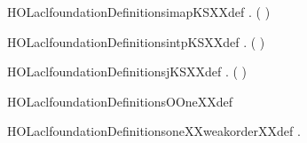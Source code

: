 \newcommand{\HOLaclfoundationDatatypesPrinc}{\UseVerbatim{HOLaclfoundationDatatypesPrinc}}
\newcommand{\HOLaclfoundationDatatypes}{
\HOLaclfoundationDatatypesForm\HOLaclfoundationDatatypesKripke\HOLaclfoundationDatatypesPrinc}
\begin{SaveVerbatim}{HOLaclfoundationDefinitionsimapKSXXdef}
\HOLTokenTurnstile{} \HOLSymConst{\HOLTokenForall{}}   .
      (    ) \HOLSymConst{=} 
\end{SaveVerbatim}
\newcommand{\HOLaclfoundationDefinitionsimapKSXXdef}{\UseVerbatim{HOLaclfoundationDefinitionsimapKSXXdef}}
\begin{SaveVerbatim}{HOLaclfoundationDefinitionsintpKSXXdef}
\HOLTokenTurnstile{} \HOLSymConst{\HOLTokenForall{}}   .
      (    ) \HOLSymConst{=} 
\end{SaveVerbatim}
\newcommand{\HOLaclfoundationDefinitionsintpKSXXdef}{\UseVerbatim{HOLaclfoundationDefinitionsintpKSXXdef}}
\begin{SaveVerbatim}{HOLaclfoundationDefinitionsjKSXXdef}
\HOLTokenTurnstile{} \HOLSymConst{\HOLTokenForall{}}   .  (    ) \HOLSymConst{=} 
\end{SaveVerbatim}
\newcommand{\HOLaclfoundationDefinitionsjKSXXdef}{\UseVerbatim{HOLaclfoundationDefinitionsjKSXXdef}}
\begin{SaveVerbatim}{HOLaclfoundationDefinitionsOOneXXdef}
\HOLTokenTurnstile{}  \HOLSymConst{=}  
\end{SaveVerbatim}
\newcommand{\HOLaclfoundationDefinitionsOOneXXdef}{\UseVerbatim{HOLaclfoundationDefinitionsOOneXXdef}}
\begin{SaveVerbatim}{HOLaclfoundationDefinitionsoneXXweakorderXXdef}
\HOLTokenTurnstile{} \HOLSymConst{\HOLTokenForall{}} .    \HOLSymConst{\HOLTokenEquiv{}} 
\end{SaveVerbatim}
\newcommand{\HOLaclfoundationDefinitionsoneXXweakorderXXdef}{\UseVerbatim{HOLaclfoundationDefinitionsoneXXweakorderXXdef}}
